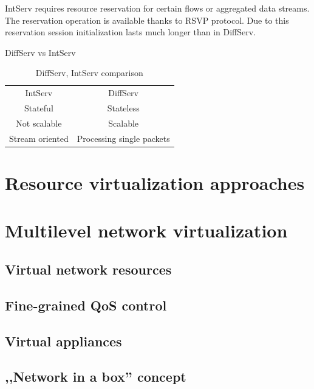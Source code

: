 \documentclass[11pt]{book}
\begin{document}
			IntServ requires resource reservation for certain flows or aggregated data streams. The reservation 
			operation is available thanks to RSVP protocol. Due to this reservation session initialization 
			lasts much longer than in DiffServ.
			
		{DiffServ vs IntServ}
		
			\begin{table}[ht]
				\caption{DiffServ, IntServ comparison}
				\centering %
				\begin{tabular}{c c}
					\hline \hline
					IntServ & DiffServ \\
					Stateful & Stateless \\
					Not scalable & Scalable \\
					Stream oriented & Processing single packets \\
					\hline
				\end{tabular}
			\end{table}


    \section{Resource virtualization approaches}



    \section{Multilevel network virtualization}

      \subsection{Virtual network resources}

      \subsection{Fine-grained QoS control}

      \subsection{Virtual appliances}

      \subsection{,,Network in a box'' concept}
\end{document}
